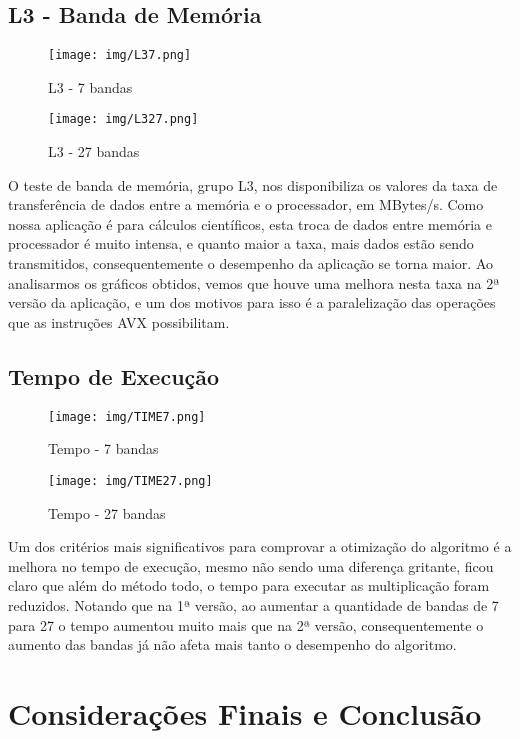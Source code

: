 \documentclass[12pt]{article}
\begin{document}
\subsection{L3 - Banda de Memória}

\begin{figure}[H]
\centering
    \texttt{[image: img/L37.png]}
    \caption{L3 - 7 bandas}
\end{figure}

\begin{figure}[H]
\centering
    \texttt{[image: img/L327.png]}
    \caption{L3 - 27 bandas}
\end{figure}

O teste de banda de memória, grupo L3, nos disponibiliza os valores da taxa de transferência de dados entre a memória e o processador, em MBytes/s. Como nossa aplicação é para cálculos científicos, esta troca de dados entre memória e processador é muito intensa, e quanto maior a taxa, mais dados estão sendo transmitidos, consequentemente o desempenho da aplicação se torna maior. Ao analisarmos os gráficos obtidos, vemos que houve uma melhora nesta taxa na 2ª versão da aplicação, e um dos motivos para isso é a paralelização das operações que as instruções AVX possibilitam.

\subsection{Tempo de Execução}

\begin{figure}[H]
\centering
    \texttt{[image: img/TIME7.png]}
    \caption{Tempo - 7 bandas}
\end{figure}

\begin{figure}[H]
\centering
    \texttt{[image: img/TIME27.png]}
    \caption{Tempo - 27 bandas}
\end{figure}

Um dos critérios mais significativos para comprovar a otimização do algoritmo é a melhora no tempo de execução, mesmo não sendo uma diferença gritante, ficou claro que além do método todo, o tempo para executar as multiplicação foram reduzidos. Notando que na 1ª versão, ao aumentar a quantidade de bandas de 7 para 27 o tempo aumentou muito mais que na 2ª versão, consequentemente o aumento das bandas já não afeta mais tanto o desempenho do algoritmo.

\section{Considerações Finais e Conclusão}
\end{document}
